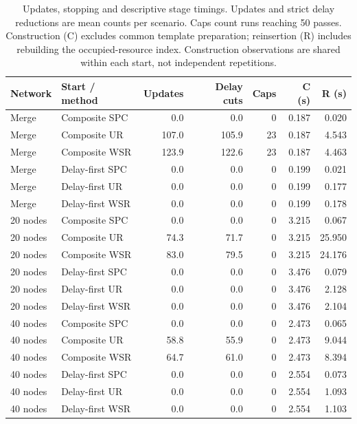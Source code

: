 \begin{table}[!htbp]
\caption{Updates, stopping and descriptive stage timings. Updates and strict delay reductions are mean counts per scenario. Caps count runs reaching 50 passes. Construction (C) excludes common template preparation; reinsertion (R) includes rebuilding the occupied-resource index. Construction observations are shared within each start, not independent repetitions.}\label{tab:construction-timing}
\centering\small
\begin{tabularx}{\textwidth}{l L r r r r r}
\toprule Network & Start / method & Updates & Delay cuts & Caps & C (s) & R (s)\\\midrule
Merge & Composite SPC & 0.0 & 0.0 & 0 & 0.187 & 0.020\\
Merge & Composite UR & 107.0 & 105.9 & 23 & 0.187 & 4.543\\
Merge & Composite WSR & 123.9 & 122.6 & 23 & 0.187 & 4.463\\
Merge & Delay-first SPC & 0.0 & 0.0 & 0 & 0.199 & 0.021\\
Merge & Delay-first UR & 0.0 & 0.0 & 0 & 0.199 & 0.177\\
Merge & Delay-first WSR & 0.0 & 0.0 & 0 & 0.199 & 0.178\\
20 nodes & Composite SPC & 0.0 & 0.0 & 0 & 3.215 & 0.067\\
20 nodes & Composite UR & 74.3 & 71.7 & 0 & 3.215 & 25.950\\
20 nodes & Composite WSR & 83.0 & 79.5 & 0 & 3.215 & 24.176\\
20 nodes & Delay-first SPC & 0.0 & 0.0 & 0 & 3.476 & 0.079\\
20 nodes & Delay-first UR & 0.0 & 0.0 & 0 & 3.476 & 2.128\\
20 nodes & Delay-first WSR & 0.0 & 0.0 & 0 & 3.476 & 2.104\\
40 nodes & Composite SPC & 0.0 & 0.0 & 0 & 2.473 & 0.065\\
40 nodes & Composite UR & 58.8 & 55.9 & 0 & 2.473 & 9.044\\
40 nodes & Composite WSR & 64.7 & 61.0 & 0 & 2.473 & 8.394\\
40 nodes & Delay-first SPC & 0.0 & 0.0 & 0 & 2.554 & 0.073\\
40 nodes & Delay-first UR & 0.0 & 0.0 & 0 & 2.554 & 1.093\\
40 nodes & Delay-first WSR & 0.0 & 0.0 & 0 & 2.554 & 1.103\\
\bottomrule
\end{tabularx}
\end{table}
